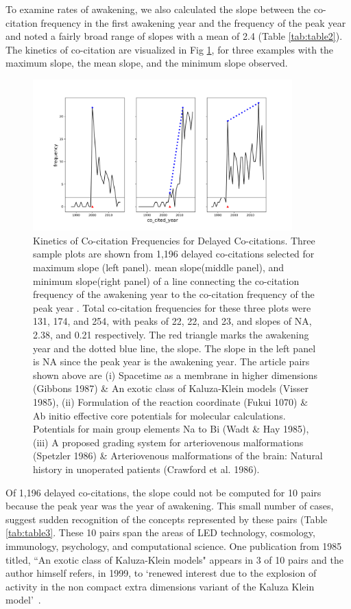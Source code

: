 \documentclass[11pt, oneside]{article}   	%
\begin{document}
To examine rates of awakening, we also calculated the slope between the co-citation frequency in the first awakening year and the frequency of the peak year and noted a fairly broad range of slopes with a mean of 2.4 (Table \ref{tab:table2}). The kinetics of co-citation are visualized in Fig \ref{fig:fig2}, for three examples with the maximum slope, the mean slope, and the minimum slope observed.  
\begin{figure}[h!]
\begin{center}
\includegraphics[width=10cm]{fig2.png}%
\end{center}
\caption{Kinetics of Co-citation Frequencies for Delayed Co-citations. Three sample plots are shown from 1,196 delayed co-citations selected for maximum slope (left panel). mean slope(middle panel), and minimum slope(right panel) of a line connecting the co-citation frequency of the awakening year to the co-citation frequency of the peak year . Total co-citation frequencies for these three plots were 131, 174, and 254, with peaks of 22, 22, and 23, and slopes of NA, 2.38, and 0.21 respectively. The red triangle marks the awakening year and the dotted blue line, the slope. The slope in the left panel is NA since the peak year is the awakening year. The article pairs shown above are (i) Spacetime as a membrane in higher dimensions (Gibbons 1987) \& An exotic class of Kaluza-Klein models (Visser 1985), (ii) Formulation of the reaction coordinate (Fukui 1070) \& Ab initio effective core potentials for molecular calculations. Potentials for main group elements Na to Bi (Wadt \& Hay 1985), (iii) A proposed grading system for arteriovenous malformations (Spetzler 1986) \& Arteriovenous malformations of the brain: Natural history in unoperated patients (Crawford et al. 1986).}
\label{fig:fig2}
\end{figure}

Of 1,196 delayed co-citations, the slope could not be computed for 10 pairs because the peak year was the year of awakening. This small number of cases, suggest sudden recognition of the concepts represented by these pairs (Table \ref{tab:table3}. These 10 pairs span the areas of LED technology, cosmology, immunology, psychology, and computational science. One publication from 1985 titled, ``An exotic class of Kaluza-Klein models" appears in 3 of 10 pairs and the author himself refers, in 1999, to `renewed interest due to the explosion of activity in the non compact extra dimensions variant of the Kaluza Klein model'~\citep{visser_1999}.
\end{document}
